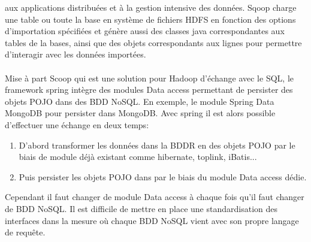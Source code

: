 aux applications distribuées et à la gestion intensive des
données. \textsf{Sqoop} charge une table ou toute la base en système
de fichiers \textsf{HDFS} en fonction des options d'importation
spécifiées et génère aussi des classes \textsf{java} correspondantes
aux tables de la bases, ainsi que des objets correspondants aux lignes
pour permettre d'interagir avec les données importées.
\\
\\
Mise à part \textsf{Scoop} qui est une solution pour \textsf{Hadoop}
d'échange avec le \textsf{SQL}, le framework
\textsf{spring} intègre des modules \textsf{Data access}\cite{springsource} permettant 
de persister des objets \textsf{POJO} dans des \textsf{BDD NoSQL}. En exemple, 
le module \textsf{Spring Data MongoDB} pour persister dans \textsf{MongoDB}. Avec \textsf{spring} il est alors possible
d'effectuer une échange en deux temps:
\begin{enumerate}
\item D'abord transformer les données dans la \textsf{BDDR} en des objets \textsf{POJO} par le biais de module déjà existant comme \textsf{hibernate, toplink, iBatis}...
\item Puis persister les objets \textsf{POJO} dans par le biais du module \textsf{Data access} dédie.    
\end{enumerate} 
Cependant il faut changer de module \textsf{Data access} à chaque fois
qu'il faut changer de \textsf{BDD NoSQL}. Il est difficile de mettre
en place une standardisation des interfaces dans la mesure où
chaque \textsf{BDD NoSQL} vient avec son propre langage de requête.
